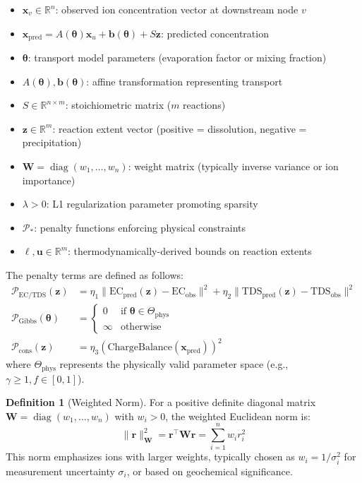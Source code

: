 \documentclass[12pt,a4paper]{article}
\theoremstyle{plain}
\theoremstyle{definition}
\newtheorem{definition}[theorem]{Definition}
\theoremstyle{remark}
\DeclareMathOperator{\diag}{diag}
\begin{document}
\begin{itemize}
	\item $\mathbf{x}_v \in \mathbb{R}^n$: observed ion concentration vector at downstream node $v$
	\item $\mathbf{x}_{\text{pred}} = A(\boldsymbol{\theta}) \mathbf{x}_u + \mathbf{b}(\boldsymbol{\theta}) + S \mathbf{z}$: predicted concentration
	\item $\boldsymbol{\theta}$: transport model parameters (evaporation factor or mixing fraction)
	\item $A(\boldsymbol{\theta}), \mathbf{b}(\boldsymbol{\theta})$: affine transformation representing transport
	\item $S \in \mathbb{R}^{n \times m}$: stoichiometric matrix ($m$ reactions)
	\item $\mathbf{z} \in \mathbb{R}^m$: reaction extent vector (positive = dissolution, negative = precipitation)
	\item $\mathbf{W} = \diag(w_1, \ldots, w_n)$: weight matrix (typically inverse variance or ion importance)
	\item $\lambda > 0$: L1 regularization parameter promoting sparsity
	\item $\mathcal{P}_*$: penalty functions enforcing physical constraints
	\item $\boldsymbol{\ell}, \mathbf{u} \in \mathbb{R}^m$: thermodynamically-derived bounds on reaction extents
\end{itemize}

The penalty terms are defined as follows:
\begin{align}
	\mathcal{P}_{\text{EC/TDS}}(\mathbf{z})         & = \eta_1 \|\text{EC}_{\text{pred}}(\mathbf{z}) - \text{EC}_{\text{obs}}\|^2 + \eta_2 \|\text{TDS}_{\text{pred}}(\mathbf{z}) - \text{TDS}_{\text{obs}}\|^2 \\
	\mathcal{P}_{\text{Gibbs}}(\boldsymbol{\theta}) & = \begin{cases} 0 & \text{if } \boldsymbol{\theta} \in \Theta_{\text{phys}} \\ \infty & \text{otherwise} \end{cases}                      \\
	\mathcal{P}_{\text{cons}}(\mathbf{z})           & = \eta_3 (\text{ChargeBalance}(\mathbf{x}_{\text{pred}}))^2
\end{align}
where $\Theta_{\text{phys}}$ represents the physically valid parameter space (e.g., $\gamma \ge 1, f \in [0,1]$).

\begin{definition}[Weighted Norm]
	For a positive definite diagonal matrix $\mathbf{W} = \diag(w_1, \ldots, w_n)$ with $w_i > 0$, the weighted Euclidean norm is:
	\begin{equation}
		\|\mathbf{r}\|_{\mathbf{W}}^2 = \mathbf{r}^\top \mathbf{W} \mathbf{r} = \sum_{i=1}^n w_i r_i^2
	\end{equation}
	This norm emphasizes ions with larger weights, typically chosen as $w_i = 1/\sigma_i^2$ for measurement uncertainty $\sigma_i$, or based on geochemical significance.
\end{definition}
\end{document}
